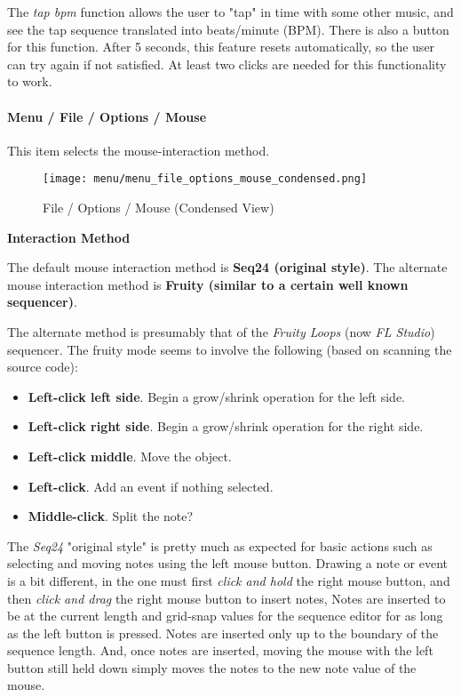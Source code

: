    The \textsl{tap bpm} function allows the user to "tap" in time with some
   other music, and see the tap sequence translated into beats/minute (BPM).
   There is also a button for this function.
   After 5 seconds, this feature resets automatically, so the user can try
   again if not satisfied.  At least two clicks are needed for this
   functionality to work.

\paragraph{Menu / File / Options / Mouse }
\label{paragraph:seq64_menu_file_options_mouse}

   This item selects the mouse-interaction method.

\begin{figure}[H]
   \centering 
   \texttt{[image: menu/menu\_file\_options\_mouse\_condensed.png]}
   \caption{File / Options / Mouse (Condensed View)}
   \label{fig:seq64_menu_file_options_mouse}
\end{figure}

   \textbf{Interaction Method}

   The default mouse interaction method is \textbf{Seq24 (original style)}.
   The alternate mouse interaction method is \textbf{Fruity (similar to a
   certain well known sequencer)}.

   The alternate method is presumably that of the \textsl{Fruity Loops}
   (now \textsl{FL Studio}) sequencer.  The fruity mode seems to involve the
   following (based on scanning the source code):

   \begin{itemize}
      \item \textbf{Left-click left side}.
         Begin a grow/shrink operation for the left side.
      \item \textbf{Left-click right side}.
         Begin a grow/shrink operation for the right side.
      \item \textbf{Left-click middle}.
         Move the object.
      \item \textbf{Left-click}.
         Add an event if nothing selected.
      \item \textbf{Middle-click}.
         Split the note?
   \end{itemize}

   The \textsl{Seq24} "original style" is pretty much as expected for basic
   actions such as selecting and moving notes using the left mouse button.
   Drawing a note or event is a bit different, in the one must first
   \textsl{click and hold} the right mouse button, and then
   \textsl{click and drag} the right mouse button to insert notes,
   Notes are inserted to be at the current length and grid-snap values for
   the sequence editor for as long as the left button is pressed.
   Notes are inserted only up to the boundary of the sequence length.
   And, once notes are inserted, moving the mouse with the left button still
   held down simply moves the notes to the new note value of the mouse.

